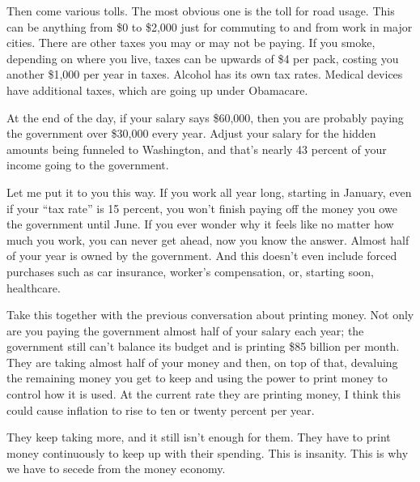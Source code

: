 Then come various
tolls. The most obvious one is the toll for road usage. This can be
anything from \$0 to \$2,000 just for commuting to and from work in
major cities.  There are other taxes you may or may not be paying. If
you smoke, depending on where you live, taxes can be upwards of \$4 per
pack, costing you another \$1,000 per year in taxes. Alcohol has its
own tax rates. Medical devices have additional taxes, which are going
up under Obamacare.

At the end of the day, if your salary says \$60,000, then you are
probably paying the government over \$30,000 every year. Adjust your
salary for the hidden amounts being funneled to Washington, and that’s
nearly 43 percent of your income going to the government.

Let me put it to you this way. If you work all year long, starting in
January, even if your “tax rate” is 15 percent, you won’t finish paying
off the money you owe the government until June. If you ever wonder why
it feels like no matter how much you work, you can never get ahead, now
you know the answer. Almost half of your year is owned by the
government. And this doesn’t even include forced purchases such as car
insurance, worker’s compensation, or, starting soon, healthcare.

Take this together with the previous conversation about printing money.
Not only are you paying the government almost half of your salary each
year; the government still can’t balance its budget and is printing
\$85 billion per month. They are taking almost half of your money and
then, on top of that, devaluing the remaining money you get to keep
and using the power to print money to control how it is used. At the current rate
they are printing money, I think this could cause inflation to rise to ten or
twenty percent per year. 

They keep taking more, and it still isn't enough for them. They have to print
money continuously to keep up with their spending. This is insanity. This is why we have to
secede from the money economy.

